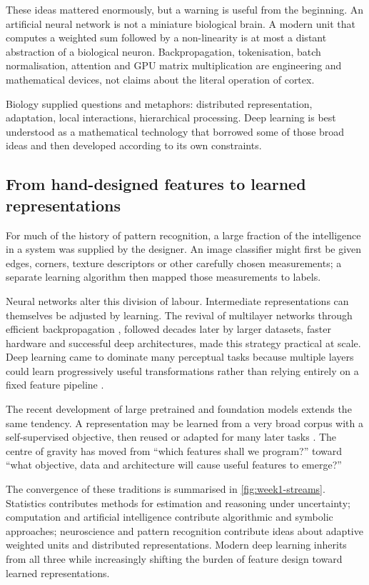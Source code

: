 These ideas mattered enormously, but a warning is useful from the beginning. An artificial neural network is not a miniature biological brain. A modern unit that computes a weighted sum followed by a non-linearity is at most a distant abstraction of a biological neuron. Backpropagation, tokenisation, batch normalisation, attention and GPU matrix multiplication are engineering and mathematical devices, not claims about the literal operation of cortex.

Biology supplied questions and metaphors: distributed representation, adaptation, local interactions, hierarchical processing. Deep learning is best understood as a mathematical technology that borrowed some of those broad ideas and then developed according to its own constraints.

\subsection{From hand-designed features to learned representations}

For much of the history of pattern recognition, a large fraction of the intelligence in a system was supplied by the designer. An image classifier might first be given edges, corners, texture descriptors or other carefully chosen measurements; a separate learning algorithm then mapped those measurements to labels.

Neural networks alter this division of labour. Intermediate representations can themselves be adjusted by learning. The revival of multilayer networks through efficient backpropagation \parencite{rumelhart1986}, followed decades later by larger datasets, faster hardware and successful deep architectures, made this strategy practical at scale. Deep learning came to dominate many perceptual tasks because multiple layers could learn progressively useful transformations rather than relying entirely on a fixed feature pipeline \parencite{lecun2015}.

The recent development of large pretrained and foundation models extends the same tendency. A representation may be learned from a very broad corpus with a self-supervised objective, then reused or adapted for many later tasks \parencite{bommasani2021}. The centre of gravity has moved from ``which features shall we program?'' toward ``what objective, data and architecture will cause useful features to emerge?''

The convergence of these traditions is summarised in \cref{fig:week1-streams}. Statistics contributes methods for estimation and reasoning under uncertainty; computation and artificial intelligence contribute algorithmic and symbolic approaches; neuroscience and pattern recognition contribute ideas about adaptive weighted units and distributed representations. Modern deep learning inherits from all three while increasingly shifting the burden of feature design toward learned representations.

